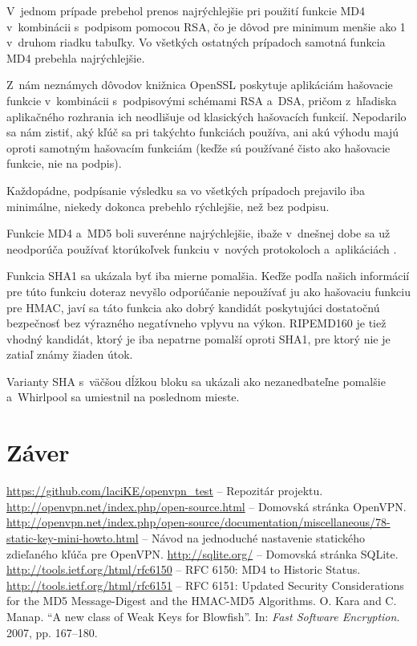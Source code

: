 \documentclass[12pt,a4paper]{article}
\begin{document}
V~jednom prípade prebehol prenos najrýchlejšie pri použití funkcie MD4
v~kombinácii s~podpisom pomocou RSA, čo je dôvod pre minimum menšie ako 1
v~druhom riadku tabuľky. Vo všetkých ostatných prípadoch samotná funkcia
MD4 prebehla najrýchlejšie.

Z~nám neznámych dôvodov knižnica OpenSSL poskytuje aplikáciám hašovacie
funkcie v~kombinácii s~podpisovými schémami RSA a~DSA, pričom z~hľadiska
aplikačného rozhrania ich neodlišuje od klasických hašovacích funkcií.
Nepodarilo sa nám zistiť, aký kľúč sa pri takýchto funkciách používa, ani
akú výhodu majú oproti samotným hašovacím funkciám (keďže sú používané
čisto ako hašovacie funkcie, nie na podpis).

Každopádne, podpísanie výsledku sa vo všetkých prípadoch prejavilo iba
minimálne, niekedy dokonca prebehlo rýchlejšie, než bez podpisu.

Funkcie MD4 a~MD5 boli suverénne najrýchlejšie, ibaže v~dnešnej dobe sa
už neodporúča používať ktorúkoľvek funkciu v~nových protokoloch
a~aplikáciách \cite{rfc-md4-obsolete, rfc-hmac-md5}.

Funkcia SHA1 sa ukázala byť iba mierne pomalšia. Keďže podľa našich
informácií pre túto funkciu doteraz nevyšlo odporúčanie nepoužívať ju ako
hašovaciu funkciu pre HMAC, javí sa táto funkcia ako dobrý kandidát
poskytujúci dostatočnú bezpečnosť bez výrazného negatívneho vplyvu na
výkon. RIPEMD160 je tiež vhodný kandidát, ktorý je iba nepatrne pomalší
oproti SHA1, pre ktorý nie je zatiaľ známy žiaden útok.

Varianty SHA s~väčšou dĺžkou bloku sa ukázali ako nezanedbateľne pomalšie
a~Whirlpool sa umiestnil na poslednom mieste.

\section{Záver}

\renewcommand{\refname}{Literatúra}
{}
\begin{thebibliography}{99}
   \url{https://github.com/laciKE/openvpn_test} -- Repozitár projektu.
   \url{http://openvpn.net/index.php/open-source.html} -- Domovská stránka OpenVPN.
   \url{http://openvpn.net/index.php/open-source/documentation/miscellaneous/78-static-key-mini-howto.html} -- Návod na jednoduché nastavenie statického zdieľaného kľúča pre OpenVPN.
   \url{http://sqlite.org/} -- Domovská stránka SQLite.
   \url{http://tools.ietf.org/html/rfc6150} -- RFC 6150: MD4 to Historic Status.
   \url{http://tools.ietf.org/html/rfc6151} -- RFC 6151: Updated Security Considerations for the MD5 Message-Digest and the HMAC-MD5 Algorithms.
   O. Kara and C. Manap. ``A new class of Weak Keys for Blowfish''. In: \emph{Fast Software Encryption}. 2007, pp. 167--180.
\end{thebibliography}
\end{document}
